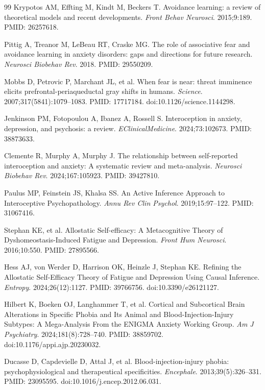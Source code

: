 \documentclass[9pt,twocolumn]{article}
\begin{document}
\begin{thebibliography}{99}
Krypotos AM, Effting M, Kindt M, Beckers T. Avoidance learning: a review of theoretical models and recent developments. \emph{Front Behav Neurosci}. 2015;9:189. PMID: 26257618.

Pittig A, Treanor M, LeBeau RT, Craske MG. The role of associative fear and avoidance learning in anxiety disorders: gaps and directions for future research. \emph{Neurosci Biobehav Rev}. 2018. PMID: 29550209.

Mobbs D, Petrovic P, Marchant JL, et al. When fear is near: threat imminence elicits prefrontal-periaqueductal gray shifts in humans. \emph{Science}. 2007;317(5841):1079--1083. PMID: 17717184. doi:10.1126/science.1144298.

Jenkinson PM, Fotopoulou A, Ibanez A, Rossell S. Interoception in anxiety, depression, and psychosis: a review. \emph{EClinicalMedicine}. 2024;73:102673. PMID: 38873633.

Clemente R, Murphy A, Murphy J. The relationship between self-reported interoception and anxiety: A systematic review and meta-analysis. \emph{Neurosci Biobehav Rev}. 2024;167:105923. PMID: 39427810.

Paulus MP, Feinstein JS, Khalsa SS. An Active Inference Approach to Interoceptive Psychopathology. \emph{Annu Rev Clin Psychol}. 2019;15:97--122. PMID: 31067416.

Stephan KE, et al. Allostatic Self-efficacy: A Metacognitive Theory of Dyshomeostasis-Induced Fatigue and Depression. \emph{Front Hum Neurosci}. 2016;10:550. PMID: 27895566.

Hess AJ, von Werder D, Harrison OK, Heinzle J, Stephan KE. Refining the Allostatic Self-Efficacy Theory of Fatigue and Depression Using Causal Inference. \emph{Entropy}. 2024;26(12):1127. PMID: 39766756. doi:10.3390/e26121127.

Hilbert K, Boeken OJ, Langhammer T, et al. Cortical and Subcortical Brain Alterations in Specific Phobia and Its Animal and Blood-Injection-Injury Subtypes: A Mega-Analysis From the ENIGMA Anxiety Working Group. \emph{Am J Psychiatry}. 2024;181(8):728--740. PMID: 38859702. doi:10.1176/appi.ajp.20230032.

Ducasse D, Capdevielle D, Attal J, et al. Blood-injection-injury phobia: psychophysiological and therapeutical specificities. \emph{Encephale}. 2013;39(5):326--331. PMID: 23095595. doi:10.1016/j.encep.2012.06.031.


\end{thebibliography}
\end{document}
